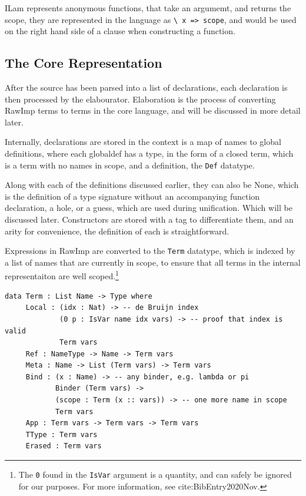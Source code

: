 \documentclass[a4paper]{article}
\begin{document}
ILam represents anonymous functions, that take an argumemt, and returns the
scope, they are represented in the language as \texttt{\textbackslash{} x => scope}, and would
be used on the right hand side of a clause when constructing a function.

\subsection{The Core Representation}
\label{sec:orga515e55}

After the source has been parsed into a list of declarations, each 
declaration is then processed by the elabourator. Elaboration is 
the process of converting RawImp terms to terms in the core language,
and will be discussed in more detail later. 

Internally, declarations are stored in the context is a map of names 
to global definitions, where each globaldef has a type, in the 
form of a closed term, which is a term with no names in scope, and a 
definition, the \texttt{Def} datatype.

Along with each of the definitions discussed earlier, they can also be
None, which is the definition of a type signature without an 
accompanying function declaration, a hole, or a guess, which are used 
during unification. Which will be discussed later. Constructors are
stored with a tag to differentiate them, and an arity for convenience,
the definition of each is straightforward.

Expressions in RawImp are converted to the \texttt{Term} datatype, which is 
indexed by a list of names that are currently in scope, to ensure that
all terms in the internal representaiton are well scoped.\footnote{The \texttt{0} found in the \texttt{IsVar} argument is a quantity, and can safely be ignored for our purposes. For more information, see cite:BibEntry2020Nov.}

\begin{center}
\begin{verbatim}
data Term : List Name -> Type where
	 Local : (idx : Nat) -> -- de Bruijn index
			 (0 p : IsVar name idx vars) -> -- proof that index is valid
			 Term vars
	 Ref : NameType -> Name -> Term vars 
	 Meta : Name -> List (Term vars) -> Term vars
	 Bind : (x : Name) -> -- any binder, e.g. lambda or pi
			Binder (Term vars) ->
			(scope : Term (x :: vars)) -> -- one more name in scope
			Term vars
	 App : Term vars -> Term vars -> Term vars 
	 TType : Term vars
	 Erased : Term vars
\end{verbatim}
\end{center}
\end{document}
